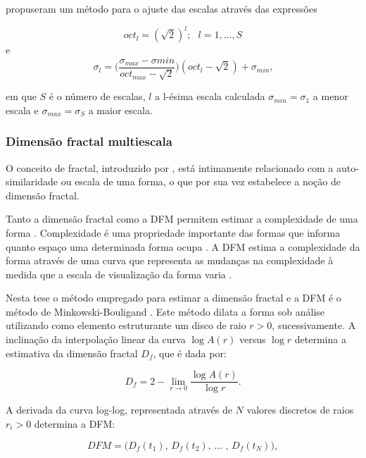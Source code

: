  propuseram um método para o ajuste das escalas através das expressões

\begin{equation}
oct_l = (\sqrt{2})^l;\text{ }l = 1,\ldots,S
\end{equation} 
\noindent e
\begin{equation}
\sigma_l = \big(\frac{\sigma_{max} - \sigma{min}}{oct_{max}-\sqrt{2}}\big)(oct_l - \sqrt{2})+\sigma_{min}\text{,}
\end{equation}

\noindent em que $S$ é o número de escalas, $l$ a l-ésima escala calculada $\sigma_{min} = \sigma_1$ a menor escala e $\sigma_{max} = \sigma_S$ a maior escala.

 
\subsubsection*{Dimensão fractal multiescala}

O conceito de fractal, introduzido por , está intimamente relacionado com a auto-similaridade ou escala de uma forma, o que por sua vez estabelece a noção de dimensão fractal.

Tanto a dimensão fractal como a \ac{DFM} permitem estimar a complexidade de uma forma \cite{Backes:2012}. Complexidade é uma propriedade importante das formas que informa quanto espaço uma determinada forma ocupa \cite{Costa:2009}. A \ac{DFM} estima a complexidade da forma através de uma curva que representa as mudanças na complexidade à medida que a escala de visualização da forma varia \cite{Florindo:2012}.

Nesta tese o método empregado para estimar a dimensão fractal e a \acl{DFM} é o método de Minkowski-Bouligand \cite{Costa:2009}. Este método dilata a forma sob análise utilizando como elemento estruturante um disco de raio $r > 0$, sucessivamente. A inclinação da interpolação linear da curva $\log{A(r)}$ versus $\log{r}$ determina a estimativa da dimensão fractal $D_f$, que é dada por:

\begin{equation}
D_f = 2 - \lim_{r \to 0}  \frac{\log{A(r)}}{\log{r}}.
\label{eq:df}
\end{equation}

A derivada da curva log-log, representada através de $N$ valores discretos de raios $r_i>0$ determina a \ac{DFM}:

\begin{equation}
DFM = \big(D_f(t_1)\text{, }D_f(t_2)\text{, }\ldots\text{ , }D_f(t_N)\big), 
\label{eq:dfm}
\end{equation}

